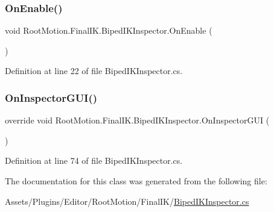 \subsubsection{\texorpdfstring{On\+Enable()}{OnEnable()}}
{\footnotesize\ttfamily void Root\+Motion.\+Final\+I\+K.\+Biped\+I\+K\+Inspector.\+On\+Enable (\begin{DoxyParamCaption}{ }\end{DoxyParamCaption})}



Definition at line 22 of file Biped\+I\+K\+Inspector.\+cs.

\mbox{\label{class_root_motion_1_1_final_i_k_1_1_biped_i_k_inspector_a14ac6ead196508bf096e4801b6fa34ed}} 
\subsubsection{\texorpdfstring{On\+Inspector\+G\+U\+I()}{OnInspectorGUI()}}
{\footnotesize\ttfamily override void Root\+Motion.\+Final\+I\+K.\+Biped\+I\+K\+Inspector.\+On\+Inspector\+G\+UI (\begin{DoxyParamCaption}{ }\end{DoxyParamCaption})}



Definition at line 74 of file Biped\+I\+K\+Inspector.\+cs.



The documentation for this class was generated from the following file\+:\begin{DoxyCompactItemize}
\item 
Assets/\+Plugins/\+Editor/\+Root\+Motion/\+Final\+I\+K/\mbox{\hyperlink{_biped_i_k_inspector_8cs}{Biped\+I\+K\+Inspector.\+cs}}\end{DoxyCompactItemize}
